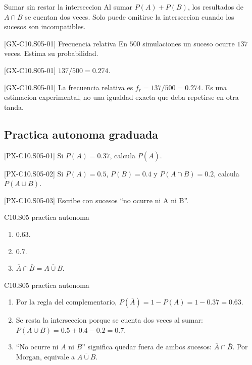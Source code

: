 \begin{commonerror}{Sumar sin restar la interseccion}
Al sumar \(P(A)+P(B)\), los resultados de \(A\cap B\) se cuentan dos veces. Solo puede omitirse
la interseccion cuando los sucesos son incompatibles.
\end{commonerror}

\begin{guidedexercise}{[GX-C10.S05-01] Frecuencia relativa}
En \(500\) simulaciones un suceso ocurre \(137\) veces. Estima su probabilidad.
\end{guidedexercise}
\begin{shortanswer}{[GX-C10.S05-01]} \(137/500=0.274\). \end{shortanswer}
\begin{fullsolution}{[GX-C10.S05-01]}
La frecuencia relativa es \(f_r=137/500=0.274\). Es una estimacion experimental, no una
igualdad exacta que deba repetirse en otra tanda.
\end{fullsolution}

\subsection*{Practica autonoma graduada}
\begin{exercise}{[PX-C10.S05-01] Si \(P(A)=0.37\), calcula \(P(\overline A)\).}\end{exercise}
\begin{exercise}{[PX-C10.S05-02] Si \(P(A)=0.5\), \(P(B)=0.4\) y \(P(A\cap B)=0.2\), calcula \(P(A\cup B)\).}\end{exercise}
\begin{exercise}{[PX-C10.S05-03] Escribe con sucesos ``no ocurre ni A ni B''.}\end{exercise}
\begin{shortanswer}{C10.S05 practica autonoma}
\begin{enumerate}
  \item \(0.63\).
  \item \(0.7\).
  \item \(\overline A\cap\overline B=\overline{A\cup B}\).
\end{enumerate}
\end{shortanswer}
\begin{fullsolution}{C10.S05 practica autonoma}
\begin{enumerate}
  \item Por la regla del complementario,
  \(P(\overline A)=1-P(A)=1-0.37=0.63\).
  \item Se resta la interseccion porque se cuenta dos veces al sumar:
  \(P(A\cup B)=0.5+0.4-0.2=0.7\).
  \item ``No ocurre ni \(A\) ni \(B\)'' significa quedar fuera de ambos sucesos:
  \(\overline A\cap\overline B\). Por Morgan, equivale a \(\overline{A\cup B}\).
\end{enumerate}
\end{fullsolution}

